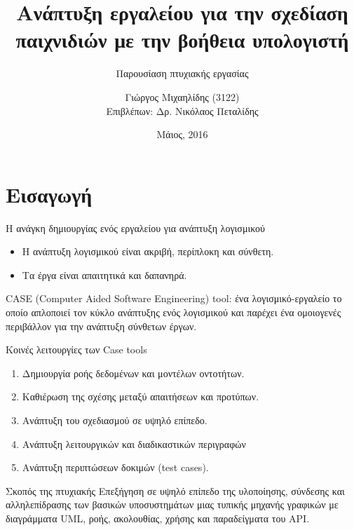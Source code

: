 \documentclass{beamer}
\title{Ανάπτυξη εργαλείου για την σχεδίαση παιχνιδιών με την βοήθεια υπολογιστή}
\subtitle{Παρουσίαση πτυχιακής εργασίας}
\date{Μάιος, 2016}
\author[Your Name]{Γιώργος Μιχαηλίδης (3122)
	\\{\small Επιβλέπων: Δρ. Νικόλαος Πεταλίδης}}
\institute{ΤΕΧΝΟΛΟΓΙΚΟ ΕΚΠΑΙΔΕΥΤΙΚΟ ΙΔΡΥΜΑ ΚΕΝΤΡΙΚΗΣ ΜΑΚΕΔΟΝΙΑΣ\\
	ΣΧΟΛΗ ΤΕΧΝΟΛΟΓΙΚΩΝ ΕΦΑΡΜΟΓΩΝ\\
	ΤΜΗΜΑ ΜΗΧΑΝΙΚΩΝ ΠΛΗΡΟΦΟΡΙΚΗΣ ΤΕ}
\begin{document}
	\maketitle
	
	\section{Εισαγωγή}
	
	\begin{frame}{Η ανάγκη δημιουργίας ενός εργαλείου για ανάπτυξη λογισμικού}
			\begin{itemize}
			\item Η ανάπτυξη λογισμικού είναι ακριβή, περίπλοκη και σύνθετη.
			\item Τα έργα είναι απαιτητικά και δαπανηρά.
			\end{itemize}
			
			\alert{CASE (Computer Aided Software Engineering) tool}: ένα λογισμικό-εργαλείο το 
			οποίο απλοποιεί τον κύκλο ανάπτυξης ενός λογισμικού και παρέχει ένα ομοιογενές περιβάλλον για την ανάπτυξη σύνθετων έργων. 

	\end{frame}		
		
	\begin{frame}{Κοινές λειτουργίες των Case tools}
			\begin{enumerate}
				\item Δημιουργία ροής δεδομένων και μοντέλων οντοτήτων.
				\item Καθιέρωση της σχέσης μεταξύ απαιτήσεων και προτύπων.
				\item Ανάπτυξη του σχεδιασμού σε υψηλό επίπεδο.
				\item Ανάπτυξη λειτουργικών και διαδικαστικών περιγραφών
				\item Ανάπτυξη περιπτώσεων δοκιμών (test cases).	
			\end{enumerate}		
	\end{frame}
		
	\begin{frame}{Σκοπός της πτυχιακής}
		 Eπεξήγηση σε υψηλό επίπεδο της υλοποίησης, σύνδεσης και αλληλεπίδρασης των βασικών υποσυστημάτων μιας τυπικής μηχανής γραφικών με διαγράμματα UML, ροής, ακολουθίας, χρήσης και παραδείγματα του API.		
	\end{frame}	
		
\end{document}
